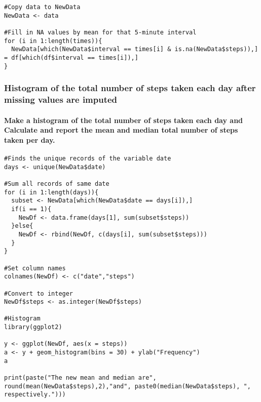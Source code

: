 \documentclass[
]{article}
\begin{document}
\begin{verbatim}
#Copy data to NewData
NewData <- data

#Fill in NA values by mean for that 5-minute interval
for (i in 1:length(times)){
  NewData[which(NewData$interval == times[i] & is.na(NewData$steps)),] = df[which(df$interval == times[i]),]
}
\end{verbatim}

\hypertarget{histogram-of-the-total-number-of-steps-taken-each-day-after-missing-values-are-imputed}{%
\subsubsection{Histogram of the total number of steps taken each day
after missing values are
imputed}\label{histogram-of-the-total-number-of-steps-taken-each-day-after-missing-values-are-imputed}}

\hypertarget{make-a-histogram-of-the-total-number-of-steps-taken-each-day-and-calculate-and-report-the-mean-and-median-total-number-of-steps-taken-per-day.}{%
\paragraph{Make a histogram of the total number of steps taken each day
and Calculate and report the mean and median total number of steps taken
per
day.}\label{make-a-histogram-of-the-total-number-of-steps-taken-each-day-and-calculate-and-report-the-mean-and-median-total-number-of-steps-taken-per-day.}}

\begin{verbatim}
#Finds the unique records of the variable date
days <- unique(NewData$date)

#Sum all records of same date
for (i in 1:length(days)){
  subset <- NewData[which(NewData$date == days[i]),]
  if(i == 1){
    NewDf <- data.frame(days[1], sum(subset$steps))
  }else{
    NewDf <- rbind(NewDf, c(days[i], sum(subset$steps)))
  }
}

#Set column names
colnames(NewDf) <- c("date","steps")

#Convert to integer
NewDf$steps <- as.integer(NewDf$steps)

#Histogram
library(ggplot2)

y <- ggplot(NewDf, aes(x = steps)) 
a <- y + geom_histogram(bins = 30) + ylab("Frequency")
a

print(paste("The new mean and median are", round(mean(NewData$steps),2),"and", paste0(median(NewData$steps), ", respectively.")))
\end{verbatim}
\end{document}
